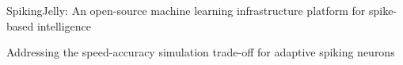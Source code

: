 \documentclass{SCIS2020cn}
\begin{document}
SpikingJelly: An open-source machine learning infrastructure platform for spike-based intelligence

Addressing the speed-accuracy simulation trade-off for adaptive spiking neurons










\makeentitle






\end{document}
